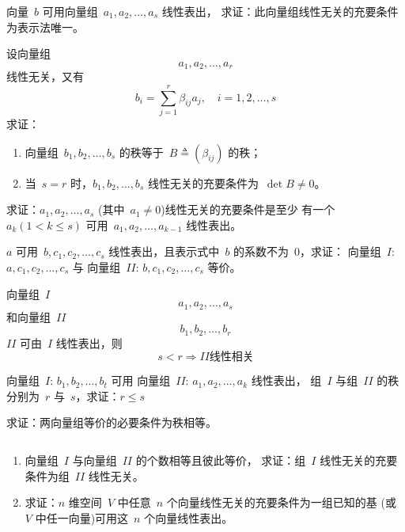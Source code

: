 \documentclass[twoside,openright]{book}
\begin{document}
\begin{CJK*}{UTF8}{}
\begin{quest}
\label{quest:118}
向量\ $b$ 可用向量组\ $a_1, a_2,\dots,a_s$ 线性表出，
求证：此向量组线性无关的充要条件为表示法唯一。
\end{quest}

\begin{quest}
\label{quest:119}
设向量组
\[
a_1, a_2,\dots,a_r
\]
线性无关，又有
\[
b_i = \sum_{j=1}^{r} \beta_{ij} a_j, \quad i = 1,2,\dots,s
\]
求证：
\begin{enumerate}
\item
向量组\ $b_1,b_2,\dots,b_s$ 的秩等于\ $B \triangleq (\beta_{ij})$ 的秩；
\item
当\ $s=r$ 时，$b_1,b_2,\dots,b_s$ 线性无关的充要条件为\ $\det B \neq 0$。
\end{enumerate}
\end{quest}

\begin{quest}
\label{quest:120}
求证：$a_1, a_2,\dots,a_s$ (其中\ $a_1 \neq 0$)线性无关的充要条件是至少
有一个\ $a_k(1 < k \leq s)$ 可用\ $a_1, a_2,\dots,a_{k-1}$ 线性表出。
\end{quest}

\begin{quest}
\label{quest:121}
$a$ 可用\ $b,c_1,c_2,\dots,c_s$ 线性表出，且表示式中\ $b$ 的系数不为\ $0$，求证：
向量组\ $I$: $a,c_1,c_2,\dots,c_s$ 与
向量组\ $II$: $b,c_1,c_2,\dots,c_s$ 等价。
\end{quest}

\begin{quest}
\label{quest:122}
向量组\ $I$
\[
a_1, a_2,\dots,a_s
\]
和向量组\ $II$
\[
b_1, b_2,\dots,b_r
\]
$II$ 可由\ $I$ 线性表出，则
\[
s < r \Longrightarrow II \text{线性相关}
\]
\end{quest}

\begin{quest}
\label{quest:123}
向量组\ $I$: $b_1,b_2,\dots,b_t$ 可用
向量组\ $II$: $a_1,a_2,\dots,a_k$ 线性表出，
组\ $I$ 与组\ $II$ 的秩分别为\ $r$ 与\ $s$，求证：$r \leq s$
\end{quest}

\begin{quest}
\label{quest:124}
求证：两向量组等价的必要条件为秩相等。
\end{quest}

\begin{quest}
\label{quest:125}
$ $

\begin{enumerate}
\item
向量组\ $I$ 与向量组\ $II$ 的个数相等且彼此等价，
求证：组\ $I$ 线性无关的充要条件为组\ $II$ 线性无关。
\item
求证：$n$ 维空间\ $V$ 中任意\ $n$ 个向量线性无关的充要条件为一组已知的基
(或\ $V$ 中任一向量)可用这\ $n$ 个向量线性表出。
\end{enumerate}
\end{quest}


\end{CJK*}
\end{document}
